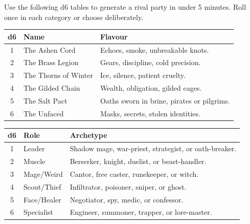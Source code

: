 Use the following d6 tables to generate a rival party in under 5 minutes. Roll once in each category or choose deliberately.

\begin{tcolorbox}[title=Rival Party Name, colback=white!97!gray, colframe=black!80!gray]
\centering
\setlength{\tabcolsep}{6pt}
\begin{tabular}{cll}
\toprule
\textbf{d6} & \textbf{Name} & \textbf{Flavour} \\
\midrule
1 & The Ashen Cord & Echoes, smoke, unbreakable knots. \\
2 & The Brass Legion & Gears, discipline, cold precision. \\
3 & The Thorns of Winter & Ice, silence, patient cruelty. \\
4 & The Gilded Chain & Wealth, obligation, gilded cages. \\
5 & The Salt Pact & Oaths sworn in brine, pirates or pilgrims. \\
6 & The Unfaced & Masks, secrets, stolen identities. \\
\bottomrule
\end{tabular}
\end{tcolorbox}

\begin{tcolorbox}[title=Composition (3–5 members), colback=white!97!gray, colframe=black!80!gray]
\centering
\begin{tabular}{cll}
\toprule
\textbf{d6} & \textbf{Role} & \textbf{Archetype} \\
\midrule
1 & Leader & Shadow mage, war-priest, strategist, or oath-breaker. \\
2 & Muscle & Berserker, knight, duelist, or beast-handler. \\
3 & Mage/Weird & Cantor, free caster, runekeeper, or witch. \\
4 & Scout/Thief & Infiltrator, poisoner, sniper, or ghost. \\
5 & Face/Healer & Negotiator, spy, medic, or confessor. \\
6 & Specialist & Engineer, summoner, trapper, or lore-master. \\
\bottomrule
\end{tabular}
\end{tcolorbox}

